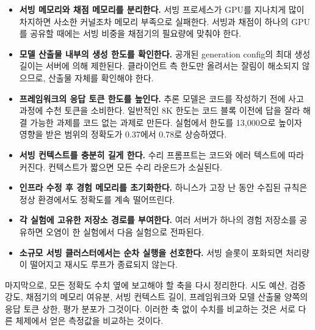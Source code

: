 \begin{itemize}\itemsep3pt
\item \textbf{서빙 메모리와 채점 메모리를 분리한다.}
서빙 프로세스가 GPU를 지나치게 많이 차지하면 사소한 커널조차 메모리 부족으로 실패한다. 서빙과
채점이 하나의 GPU를 공유할 때에는 서빙 비중을 채점기의 필요량에 맞춰야 한다.
\item \textbf{모델 산출물 내부의 생성 한도를 확인한다.}
공개된 generation config의 최대 생성 길이는 서버에 의해 제한된다. 클라이언트 측 한도만 올려서는
잘림이 해소되지 않으므로, 산출물 자체를 확인해야 한다.
\item \textbf{프레임워크의 응답 토큰 한도를 높인다.}
추론 모델은 코드를 작성하기 전에 사고 과정에 수천 토큰을 소비한다. 일반적인 8K 한도는 코드 블록
이전에 답을 잘라 해결 가능한 과제를 코드 없는 과제로 만든다. 실험에서 한도를 13{,}000으로 높이자
영향을 받은 범위의 정확도가 0.37에서 0.78로 상승하였다.
\item \textbf{서빙 컨텍스트를 충분히 길게 한다.}
수리 프롬프트는 코드와 에러 텍스트에 따라 커진다. 컨텍스트가 짧으면 모든 수리 라운드가
소실된다.
\item \textbf{인프라 수정 후 경험 메모리를 초기화한다.}
하니스가 고장 난 동안 수집된 규칙은 정상 환경에서도 정확도를 계속 떨어뜨린다.
\item \textbf{각 실험에 고유한 저장소 경로를 부여한다.}
여러 서버가 하나의 경험 저장소를 공유하면 오염이 한 실험에서 다음 실험으로 전파된다.
\item \textbf{소규모 서빙 클러스터에서는 순차 실행을 선호한다.}
서빙 슬롯이 포화되면 처리량이 떨어지고 재시도 루프가 종료되지 않는다.
\end{itemize}

마지막으로, 모든 정확도 수치 옆에 보고해야 할 축을 다시 정리한다. 시도 예산, 검증 강도, 채점기의
메모리 여유분, 서빙 컨텍스트 길이, 프레임워크와 모델 산출물 양쪽의 응답 토큰 상한, 평가 분포가
그것이다. 이러한 축 없이 수치를 비교하는 것은 서로 다른 체제에서 얻은 측정값을 비교하는 것이다.

